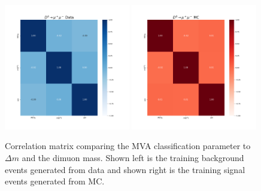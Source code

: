 \begin{figure}[htp]
    \begin{center}
      \includegraphics[width=0.49\textwidth]{figures/chapter4/mva/Correlation_data_obs.png}
      \includegraphics[width=0.49\textwidth]{figures/chapter4/mva/Correlation_dmm_obs.png}\\
    \end{center}
    \caption{
      Correlation matrix comparing the MVA classification parameter to $\Delta m$ and the dimuon mass. Shown left is the training background events generated from data and shown right is the training signal events generated from MC.
    }
    \label{fig:mva_correlation_matrix_for_fit_variables}
\end{figure}



